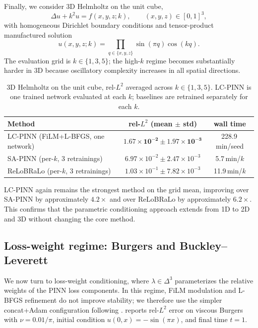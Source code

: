 \documentclass{article}
\theoremstyle{plain}
\theoremstyle{definition}
\theoremstyle{remark}
\begin{document}
Finally, we consider 3D Helmholtz on the unit cube,
\[
    \Delta u + k^2 u = f(x,y,z;k),
    \qquad (x,y,z) \in [0,1]^3,
\]
with homogeneous Dirichlet boundary conditions and tensor-product
manufactured solution
\[
    u(x,y,z;k)
    =
    \prod_{q\in\{x,y,z\}}
    \sin(\pi q)\cos(kq).
\]
The evaluation grid is $k \in \{1,3,5\}$; the high-$k$ regime becomes
substantially harder in 3D because oscillatory complexity increases in
all spatial directions.

\begin{table}[!t]
\centering
\caption{3D Helmholtz on the unit cube, rel-$L^2$ averaged across
$k \in \{1,3,5\}$. LC-PINN is one trained network evaluated at each
$k$; baselines are retrained separately for each $k$.}
\label{tab:helmholtz-3d}
\small
\begin{tabular}{lcc}
\toprule
Method & rel-$L^2$ (mean $\pm$ std) & wall time \\
\midrule
LC-PINN (FiLM+L-BFGS, one network) & $\mathbf{1.67 \times 10^{-2} \pm 1.97 \times 10^{-3}}$ & 228.9\,min/seed \\
SA-PINN (per-$k$, 3 retrainings)   & $6.97 \times 10^{-2} \pm 2.47 \times 10^{-3}$ & 5.7\,min/$k$ \\
ReLoBRaLo (per-$k$, 3 retrainings) & $1.03 \times 10^{-1} \pm 7.82 \times 10^{-3}$ & 11.9\,min/$k$ \\
\bottomrule
\end{tabular}
\end{table}

LC-PINN again remains the strongest method on the grid mean, improving
over SA-PINN by approximately $4.2\times$ and over ReLoBRaLo by
approximately $6.2\times$. This confirms that the parametric
conditioning approach extends from 1D to 2D and 3D without changing
the core method.

\subsection{Loss-weight regime: Burgers and Buckley--Leverett}
\label{sec:results-burgers-bl}

We now turn to loss-weight conditioning, where
$\lambda \in \Delta^3$ parameterizes the relative weights of the PINN
loss components. In this regime, FiLM modulation and L-BFGS refinement
do not improve stability; we therefore use the simpler
concat+Adam configuration following \citet{dosovitskiy2020}. 
 reports rel-$L^2$ error on viscous Burgers with
$\nu=0.01/\pi$, initial condition $u(0,x)=-\sin(\pi x)$, and final
time $t=1$.
\end{document}
